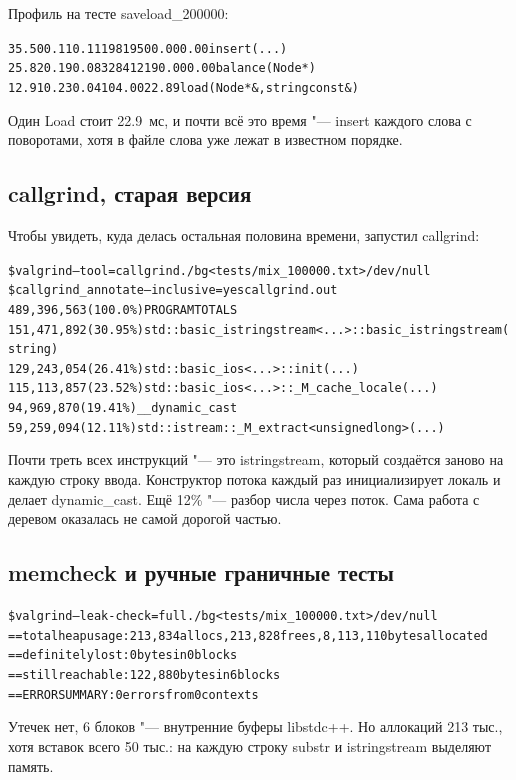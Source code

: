 Профиль на тесте {\ttfamily saveload\_200000}:
\begin{alltt}
 35.50      0.11     0.11  1981950     0.00     0.00  insert(...)
 25.82      0.19     0.08 32841219     0.00     0.00  balance(Node*)
 12.91      0.23     0.04       10     4.00    22.89  load(Node*&, string const&)
\end{alltt}
Один {\ttfamily Load} стоит 22.9~мс, и почти всё это время "--- {\ttfamily insert} каждого слова
с поворотами, хотя в файле слова уже лежат в известном порядке.

\subsection{callgrind, старая версия}
Чтобы увидеть, куда делась остальная половина времени, запустил {\ttfamily callgrind}:
\begin{alltt}
\$ valgrind --tool=callgrind ./bg < tests/mix_100000.txt > /dev/null
\$ callgrind_annotate --inclusive=yes callgrind.out
489,396,563 (100.0\%)  PROGRAM TOTALS
151,471,892 (30.95\%)  std::basic_istringstream<...>::basic_istringstream(string)
129,243,054 (26.41\%)  std::basic_ios<...>::init(...)
115,113,857 (23.52\%)  std::basic_ios<...>::_M_cache_locale(...)
 94,969,870 (19.41\%)  __dynamic_cast
 59,259,094 (12.11\%)  std::istream::_M_extract<unsigned long>(...)
\end{alltt}
Почти треть всех инструкций "--- это {\ttfamily istringstream}, который создаётся заново на каждую
строку ввода. Конструктор потока каждый раз инициализирует локаль и делает {\ttfamily dynamic\_cast}.
Ещё 12\% "--- разбор числа через поток. Сама работа с деревом оказалась не самой дорогой частью.

\subsection{memcheck и ручные граничные тесты}
\begin{alltt}
\$ valgrind --leak-check=full ./bg < tests/mix_100000.txt > /dev/null
==   total heap usage: 213,834 allocs, 213,828 frees, 8,113,110 bytes allocated
==    definitely lost: 0 bytes in 0 blocks
==    still reachable: 122,880 bytes in 6 blocks
== ERROR SUMMARY: 0 errors from 0 contexts
\end{alltt}
Утечек нет, 6 блоков "--- внутренние буферы {\ttfamily libstdc++}. Но аллокаций 213 тыс., хотя
вставок всего 50 тыс.: на каждую строку {\ttfamily substr} и {\ttfamily istringstream} выделяют память.

